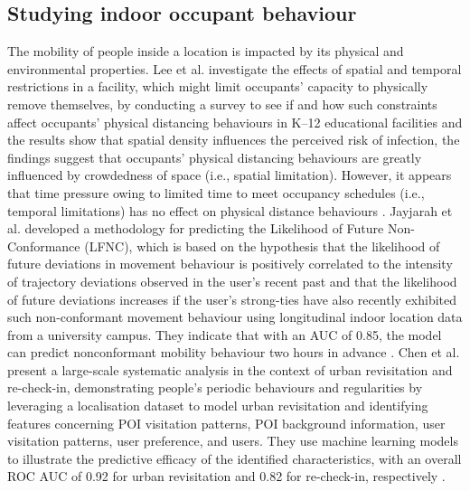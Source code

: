 \documentclass[acmtog]{acmart}
\begin{document}
\subsection{Studying indoor occupant behaviour}
The mobility of people inside a location is impacted by its physical and environmental properties. Lee et al. investigate the effects of spatial and temporal restrictions in a facility, which might limit occupants' capacity to physically remove themselves, by conducting a survey to see if and how such constraints affect occupants' physical distancing behaviours in K–12 educational facilities and the results show that spatial density influences the perceived risk of infection, the findings suggest that occupants' physical distancing behaviours are greatly influenced by crowdedness of space (i.e., spatial limitation). However, it appears that time pressure owing to limited time to meet occupancy schedules (i.e., temporal limitations) has no effect on physical distance behaviours \cite{lee2022understanding}. Jayjarah et al. developed a methodology for predicting the Likelihood of Future Non-Conformance (LFNC), which is based on the hypothesis that the likelihood of future deviations in movement behaviour is positively correlated to the intensity of trajectory deviations observed in the user's recent past and that the likelihood of future deviations increases if the user's strong-ties have also recently exhibited such non-conformant movement behaviour using longitudinal indoor location data from a university campus. They indicate that with an AUC of 0.85, the model can predict nonconformant mobility behaviour two hours in advance \cite{jayarajah2018predicting}. Chen et al. present a large-scale systematic analysis in the context of urban revisitation and re-check-in, demonstrating people's periodic behaviours and regularities by leveraging a localisation dataset to model urban revisitation and identifying features concerning POI visitation patterns, POI background information, user visitation patterns, user preference, and users. They use machine learning models to illustrate the predictive efficacy of the identified characteristics, with an overall ROC AUC of 0.92 for urban revisitation and 0.82 for re-check-in, respectively \cite{chen2020will}.
\end{document}
